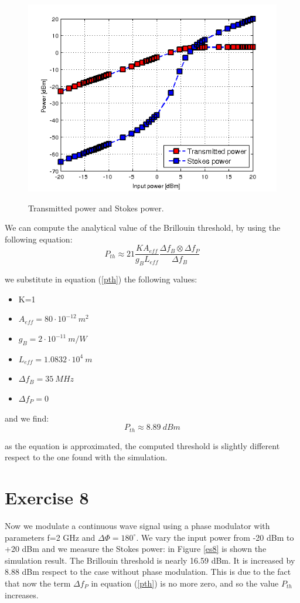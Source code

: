 \documentclass[a4paper,10pt]{report}
\begin{document}
\begin{figure}[!ht]
  \centering
  \includegraphics[width=12cm]{es7.png}\\
  \caption{Transmitted power and Stokes power.}
  \label{es7}
\end{figure}

We can compute the analytical value of the Brillouin threshold, by using the following equation:
\begin{equation}\label{pth}
P_{th}\approx21\frac{K A_{eff}}{g_B L_{eff}} \frac{\Delta f_B\otimes \Delta f_P}{\Delta f_B} 
\end{equation}

we substitute in equation (\ref{pth}) the following values:
\begin{itemize}
 \item K=1
 \item $A_{eff}=80 \cdot 10^{-12} \ m^2$
 \item $g_B=2\cdot 10^{-11} \ m/W$
 \item $L_{eff}=1.0832 \cdot 10^{4} \ m$
 \item $\Delta f_B=35\ MHz$
 \item $\Delta f_P=0$
\end{itemize}

and we find:
$$P_{th}\approx 8.89 \ dBm$$

as the equation is approximated, the computed threshold is slightly different respect to the one found with the simulation.

\newpage
\section*{Exercise 8}
Now we modulate a continuous wave signal using a phase modulator with parameters f=2 GHz and $\Delta \Phi = 180^{\circ}$.
We vary the input power from -20 dBm to +20 dBm and we measure the Stokes power: in Figure \ref{es8} is shown the simulation result.
The Brillouin threshold is nearly 16.59 dBm. It is increased by 8.88 dBm respect to the case without phase modulation.
This is due to the fact that now the term $\Delta f_P$ in equation (\ref{pth}) is no more zero, and so the value $P_{th}$ increases.
\end{document}
